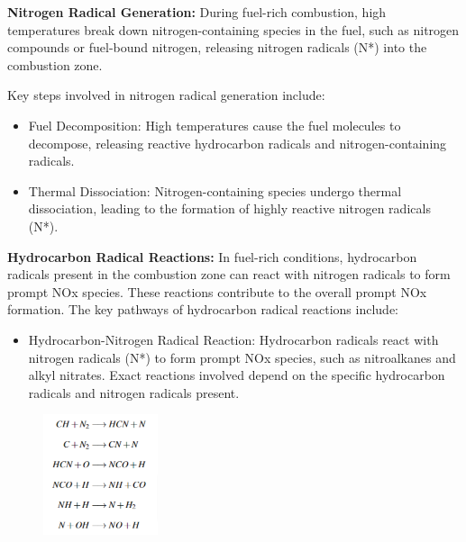 \textbf{Nitrogen Radical Generation:}
During fuel-rich combustion, high temperatures break down nitrogen-containing species in the fuel, such as nitrogen compounds or fuel-bound nitrogen, releasing nitrogen radicals (N*) into the combustion zone. 

Key steps involved in nitrogen radical generation include:
\begin{itemize}
    \item Fuel Decomposition: High temperatures cause the fuel molecules to decompose, releasing reactive hydrocarbon radicals and nitrogen-containing radicals.
    \item Thermal Dissociation: Nitrogen-containing species undergo thermal dissociation, leading to the formation of highly reactive nitrogen radicals (N*).
\end{itemize}

\textbf{Hydrocarbon Radical Reactions:}
In fuel-rich conditions, hydrocarbon radicals present in the combustion zone can react with nitrogen radicals to form prompt NOx species. These reactions contribute to the overall prompt NOx formation. The key pathways of hydrocarbon radical reactions include:
\begin{itemize}
    \item Hydrocarbon-Nitrogen Radical Reaction: Hydrocarbon radicals react with nitrogen radicals (N*) to form prompt NOx species, such as nitroalkanes and alkyl nitrates. Exact reactions involved depend on the specific hydrocarbon radicals and nitrogen radicals present.
\end{itemize}

\begin{figure}[h]
	\centering
	\includegraphics[width=0.3\textwidth]{Chapter1/Images/reaction1.png}
\end{figure}


